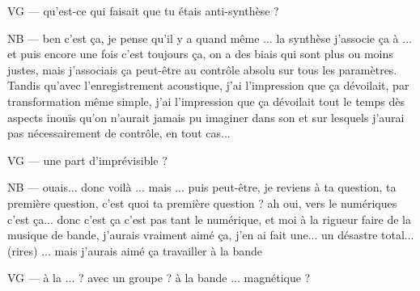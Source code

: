 VG —  qu'est-ce qui faisait que tu étais anti-synthèse ?

NB — ben c'est ça, je pense qu'il y a quand même ... la synthèse j'associe ça à ... et puis encore une fois c'est toujours ça, on a des biais qui sont plus ou moins justes, mais j'associais ça peut-être au contrôle absolu sur tous les paramètres. Tandis qu'avec l'enregistrement acoustique, j'ai l'impression que ça dévoilait, par transformation même simple, j'ai l'impression que ça dévoilait tout le temps dès aspects inouïs qu'on n'aurait jamais pu imaginer dans son et sur lesquels j'aurai pas nécessairement de contrôle, en tout cas...

VG — une part d'imprévisible ?

NB — ouais... donc voilà ... mais ... puis peut-être, je reviens à ta question, ta première question, c'est quoi ta première question ? ah oui, vers le numériques c'est ça...  donc c'est ça c'est pas tant le numérique, et moi à la rigueur faire de la musique de bande, j'aurais vraiment aimé ça, j'en ai fait une... un désastre total... (rires) ... mais j'aurais aimé ça travailler à la bande 

VG — à la ... ? avec un groupe ? à la bande ... magnétique ?

